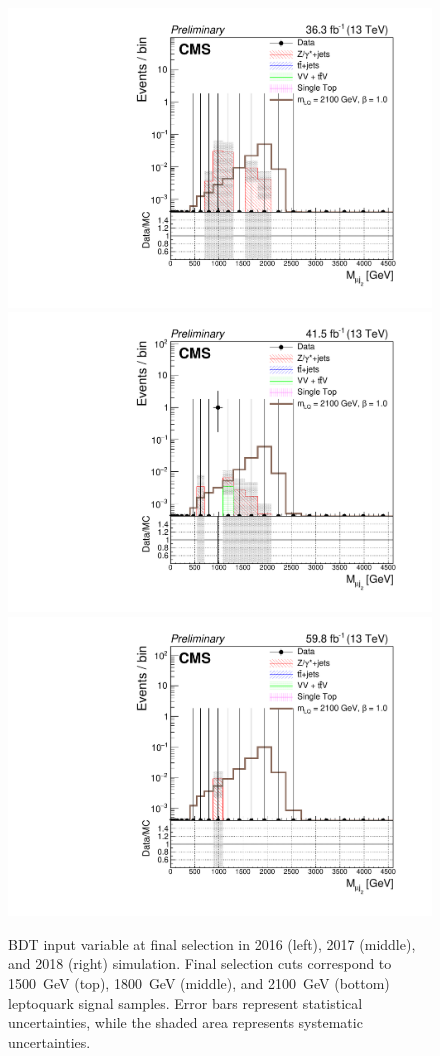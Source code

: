 \begin{figure}[H]
    {\includegraphics[width=.32\textwidth]{Images/Analysis/Results_2016_Unblinded/Plots/Final_selection/BasicLQ_uujj_M_uujj2_final2100.pdf}}
    {\includegraphics[width=.32\textwidth]{Images/Analysis/Results_2017_Unblinded/Plots/Final_selection/BasicLQ_uujj_M_uujj2_final2100.pdf}}
    {\includegraphics[width=.32\textwidth]{Images/Analysis/Results_2018_Unblinded/Plots/Final_selection/BasicLQ_uujj_M_uujj2_final2100.pdf}}
    \caption{BDT input variable \MujTwo at final selection in 2016 (left), 2017 (middle), and 2018 (right) simulation. Final selection cuts correspond to \SI{1500}{GeV} (top), \SI{1800}{GeV} (middle), and \SI{2100}{GeV} (bottom) leptoquark signal samples. Error bars represent statistical uncertainties, while the shaded area represents systematic uncertainties.
    \label{figapp:finalSelMuujj2}}
\end{figure}
